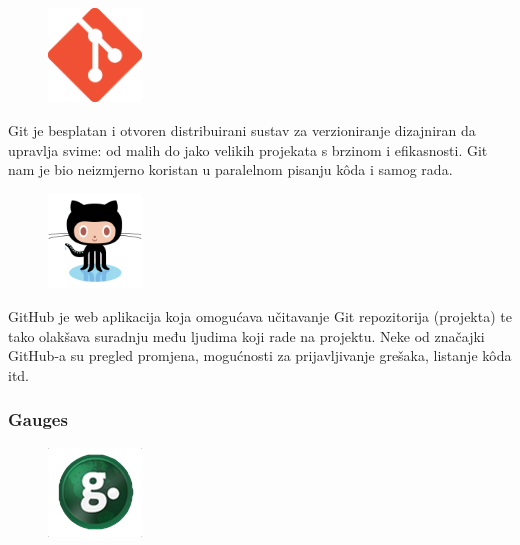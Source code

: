 \documentclass[11pt]{scrreprt}
\begin{document}
\begin{figure}
  \vspace{-10pt}
  \includegraphics[width=2.5cm]{logos/git}
  \vspace{-30pt}
\end{figure}

Git je besplatan i otvoren distribuirani sustav za verzioniranje dizajniran da
upravlja svime: od malih do jako velikih projekata s brzinom i
efikasnosti.\cite{git} Git nam je bio neizmjerno koristan u paralelnom pisanju
kôda i samog rada.

\begin{figure}
  \vspace{-10pt}
  \includegraphics[width=2.5cm]{logos/github}
  \vspace{-30pt}
\end{figure}

GitHub je web aplikacija koja omogućava učitavanje Git repozitorija (projekta)
te tako olakšava suradnju među ljudima koji rade na projektu.\cite{github} Neke
od značajki GitHub-a su pregled promjena, mogućnosti za prijavljivanje grešaka,
listanje kôda itd.

\subsubsection{Gauges}

\begin{figure}
  \vspace{-10pt}
  \includegraphics[width=2.5cm]{logos/gauges}
  \vspace{-30pt}
\end{figure}
\end{document}
